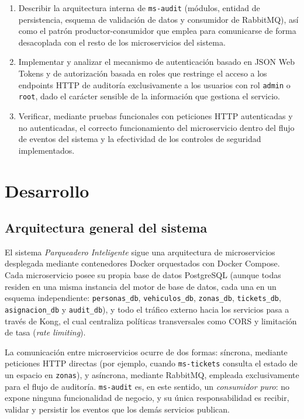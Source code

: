 \documentclass[12pt,letterpaper]{article}
\begin{document}
\begin{enumerate}[label=\arabic*.]
  \item Describir la arquitectura interna de \texttt{ms-audit} (módulos, entidad de persistencia, esquema de validación de datos y consumidor de RabbitMQ), así como el patrón productor-consumidor que emplea para comunicarse de forma desacoplada con el resto de los microservicios del sistema.
  \item Implementar y analizar el mecanismo de autenticación basado en JSON Web Tokens y de autorización basada en roles que restringe el acceso a los endpoints HTTP de auditoría exclusivamente a los usuarios con rol \texttt{admin} o \texttt{root}, dado el carácter sensible de la información que gestiona el servicio.
  \item Verificar, mediante pruebas funcionales con peticiones HTTP autenticadas y no autenticadas, el correcto funcionamiento del microservicio dentro del flujo de eventos del sistema y la efectividad de los controles de seguridad implementados.
\end{enumerate}

\newpage

\section{Desarrollo}

\subsection{Arquitectura general del sistema}

El sistema \emph{Parqueadero Inteligente} sigue una arquitectura de microservicios desplegada mediante contenedores Docker orquestados con Docker Compose. Cada microservicio posee su propia base de datos PostgreSQL (aunque todas residen en una misma instancia del motor de base de datos, cada una en un esquema independiente: \texttt{personas\_db}, \texttt{vehiculos\_db}, \texttt{zonas\_db}, \texttt{tickets\_db}, \texttt{asignacion\_db} y \texttt{audit\_db}), y todo el tráfico externo hacia los servicios pasa a través de Kong, el cual centraliza políticas transversales como CORS y limitación de tasa (\emph{rate limiting}).

La comunicación entre microservicios ocurre de dos formas: síncrona, mediante peticiones HTTP directas (por ejemplo, cuando \texttt{ms-tickets} consulta el estado de un espacio en \texttt{zonas}), y asíncrona, mediante RabbitMQ, empleada exclusivamente para el flujo de auditoría. \texttt{ms-audit} es, en este sentido, un \emph{consumidor puro}: no expone ninguna funcionalidad de negocio, y su única responsabilidad es recibir, validar y persistir los eventos que los demás servicios publican.
\end{document}
